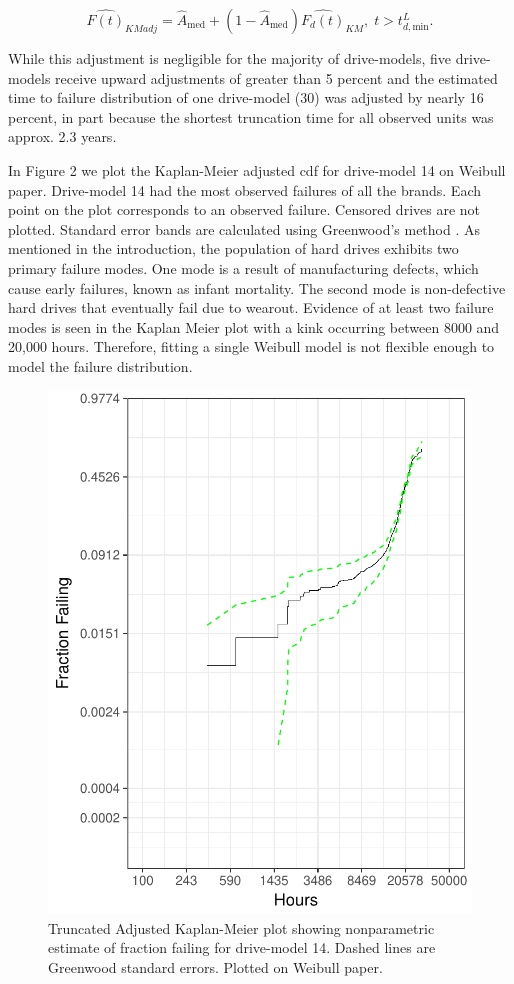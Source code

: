 \documentclass[12pt]{article}
\begin{document}
$$\widehat{F(t)}_{KMadj} = \widehat{A}_{\text{med}} + \left(1 - \widehat{A}_{\text{med}}\right)\widehat{F_d(t)}_{KM},\; t>t_{d,\text{min}}^L.$$

While this adjustment is negligible for the majority of drive-models, five drive-models receive upward adjustments of greater than 5 percent and the estimated time to failure distribution of one drive-model (30) was adjusted by nearly 16 percent, in part because the shortest truncation time for all observed units was approx. 2.3 years.


In Figure 2 we plot the Kaplan-Meier adjusted cdf for drive-model 14 on Weibull paper.  Drive-model 14 had the most observed failures of all the brands.  Each point on the plot corresponds to an observed failure.  Censored drives are not plotted.  Standard error bands are calculated using Greenwood's method \cite{green}.  As mentioned in the introduction, the population of hard drives exhibits two primary failure modes.  One mode is a result of manufacturing defects, which cause early failures, known as infant mortality.  The second mode is non-defective hard drives that eventually fail due to wearout.   Evidence of at least two failure modes is seen in the Kaplan Meier plot with a kink occurring between 8000 and 20,000 hours.  Therefore, fitting a single Weibull model is not flexible enough to model the failure distribution.

\begin{figure}[H]
\centering
\includegraphics[width=.5\textwidth]{fig/mod14-KM-adj}
\caption{Truncated Adjusted Kaplan-Meier plot showing nonparametric estimate of fraction failing for drive-model 14.  Dashed lines are Greenwood standard errors.  Plotted on Weibull paper.}
\end{figure}
\end{document}
